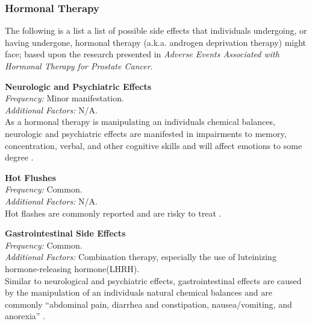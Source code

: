 \documentclass[journal]{vgtc}                %
\begin{document}
                \subsubsection{Hormonal Therapy}
                        The following is a list a list of possible side effects that individuals undergoing, or having undergone, hormonal therapy (a.k.a. androgen deprivation therapy) might face;  based upon the research presented in \textit{Adverse Events Associated with Hormonal Therapy for Prostate Cancer}\cite{AdverseEvents:2005}.
                        \newline

                        \textbf{Neurologic and Psychiatric Effects}
                        \\ \textit{Frequency:} Minor manifestation.
                        \\ \textit{Additional Factors:} N/A.
                        \\ As a hormonal therapy is manipulating an individuals chemical balances, neurologic and psychiatric effects are manifested in impairments to memory, concentration, verbal, and other cognitive skills and will affect emotions to some degree \cite{AdverseEvents:2005}.
                        \newline

                        \textbf{Hot Flushes}
                        \\ \textit{Frequency:} Common.
                        \\ \textit{Additional Factors:} N/A.
                        \\ Hot flashes are commonly reported and are risky to treat \cite{AdverseEvents:2005}.
                        \newline

                        \textbf{Gastrointestinal Side Effects}
                        \\ \textit{Frequency:} Common.
                        \\ \textit{Additional Factors:} Combination therapy, especially the use of luteinizing hormone-releasing hormone(LHRH).
                        \\ Similar to neurological and psychiatric effects, gastrointestinal effects are caused by the manipulation of an individuals natural chemical balances and are commonly ``abdominal pain, diarrhea and constipation, nausea/vomiting, and anorexia'' \cite{AdverseEvents:2005}.
                        \newline
\end{document}
